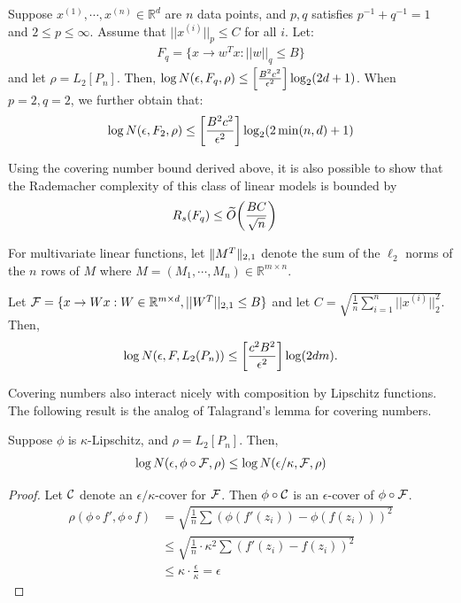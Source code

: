 \begin{theorem}
Suppose $x^{(1)}, \cdots, x^{(n)} \in \mathbb{R}^d$ are $n$ data points, and $p, q$ satisfies $p^{-1} + q^{-1} = 1$ and $2 \le p \le \infty$. Assume that $||x^{(i)}||_p \le C$ for all $i$. Let:
\begin{align}
    F_q = \{x \to w^T x : ||w||_q \le B\}
\end{align}
and let $\rho = L_2[P_n]$. Then, $\log N(\epsilon, F_q, \rho) \le \left [\frac{B^2c^2}{\epsilon^2}\right ] \log_2 (2d + 1)$. When $p = 2, q = 2$, we further obtain that:
\begin{align}
    \log N(\epsilon, F_2, \rho) \le \left [\frac{B^2c^2}{\epsilon^2} \right ] \log_2 (2 \min (n, d ) + 1)
\end{align}
\end{theorem}
\begin{remark}
Using the covering number bound derived above, it is also possible to show that the Rademacher complexity of this class of linear models is bounded by
\begin{align}
    R_s(F_q) &\le \widetilde{O}{\left( \frac{BC}{\sqrt{n}} \right)}
\end{align} 
\end{remark}
For multivariate linear functions, let $\|M^T\|_{2,1}$ denote the sum of the $\ell_2$ norms of the $n$ rows of $M$ where $M = (M_1, \cdots, M_n) \in \mathbb{R}^{m \times n}$. 
\begin{theorem}
Let $\mathcal F = \{x \to Wx : W \in \mathbb{R}^{m \times d}, ||W^T||_{2, 1} \le B\}$ and let $C = \sqrt{\frac{1}{n} \sum_{i = 1}^n ||x^{(i)}||_2^2}$. Then, 
\begin{equation}
\log N(\epsilon, F, L_2(P_n)) \le \left [\frac{c^2B^2}{\epsilon^2} \right ] \log (2dm).
\end{equation}
\end{theorem}


Covering numbers also interact nicely with composition by Lipschitz functions. The following result is the analog of Talagrand's lemma for covering numbers.
\begin{lemma} Suppose $\phi$ is $\kappa$-Lipschitz, and $\rho = L_2[P_n]$. Then,
    \begin{align}
        \log N(\epsilon, \phi \circ \mathcal F, \rho) \le \log N(\epsilon / \kappa, \mathcal F, \rho) \label{lec9:eqn:covering-num-lipschitz}
    \end{align}
\end{lemma}
\begin{proof}
Let $\mathcal C$ denote an $\epsilon/\kappa$-cover for $\mathcal F$. Then $\phi \circ \mathcal C$ is an $\epsilon$-cover of $\phi \circ \mathcal F$.
\begin{align}
\rho(\phi \circ f', \phi \circ f) &= \sqrt{\frac{1}{n} \sum (\phi(f'(z_i)) - \phi(f(z_i)))^2} \\ 
&\le \sqrt{\frac{1}{n} \cdot \kappa^2 \sum(f'(z_i) - f(z_i))^2}\\
&\le \kappa \cdot \frac{\epsilon}{\kappa} = \epsilon
\end{align}
\end{proof}

